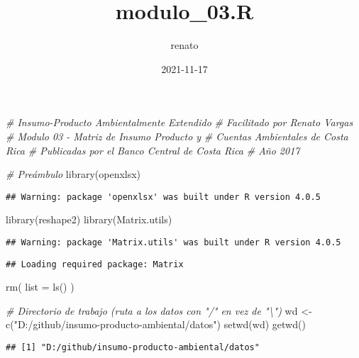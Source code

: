 \documentclass[
]{article}
\title{modulo\_03.R}
\author{renato}
\date{2021-11-17}
\newenvironment{Shaded}{\begin{snugshade}}{\end{snugshade}}
\newcommand{\AttributeTok}[1]{\textcolor[rgb]{0.77,0.63,0.00}{#1}}
\newcommand{\CommentTok}[1]{\textcolor[rgb]{0.56,0.35,0.01}{\textit{#1}}}
\newcommand{\FunctionTok}[1]{\textcolor[rgb]{0.00,0.00,0.00}{#1}}
\newcommand{\NormalTok}[1]{#1}
\newcommand{\OtherTok}[1]{\textcolor[rgb]{0.56,0.35,0.01}{#1}}
\newcommand{\StringTok}[1]{\textcolor[rgb]{0.31,0.60,0.02}{#1}}
\begin{document}
\maketitle

\begin{Shaded}
\begin{Highlighting}[]
\CommentTok{\# Insumo{-}Producto Ambientalmente Extendido}
\CommentTok{\# Facilitado por Renato Vargas}
\CommentTok{\# Modulo 03 {-} Matriz de Insumo Producto y }
\CommentTok{\# Cuentas Ambientales de Costa Rica}
\CommentTok{\# Publicadas por el Banco Central de Costa Rica}
\CommentTok{\# Año 2017}

\CommentTok{\# Preámbulo}
\FunctionTok{library}\NormalTok{(openxlsx)}
\end{Highlighting}
\end{Shaded}

\begin{verbatim}
## Warning: package 'openxlsx' was built under R version 4.0.5
\end{verbatim}

\begin{Shaded}
\begin{Highlighting}[]
\FunctionTok{library}\NormalTok{(reshape2)}
\FunctionTok{library}\NormalTok{(Matrix.utils)}
\end{Highlighting}
\end{Shaded}

\begin{verbatim}
## Warning: package 'Matrix.utils' was built under R version 4.0.5
\end{verbatim}

\begin{verbatim}
## Loading required package: Matrix
\end{verbatim}

\begin{Shaded}
\begin{Highlighting}[]
\FunctionTok{rm}\NormalTok{(  }\AttributeTok{list =} \FunctionTok{ls}\NormalTok{()  )}


\CommentTok{\# Directorio de trabajo (ruta a los datos con "/" en vez de "\textbackslash{}")}
\NormalTok{wd }\OtherTok{\textless{}{-}} \FunctionTok{c}\NormalTok{(}\StringTok{"D:/github/insumo{-}producto{-}ambiental/datos"}\NormalTok{)}
\FunctionTok{setwd}\NormalTok{(wd)}
\FunctionTok{getwd}\NormalTok{()}
\end{Highlighting}
\end{Shaded}

\begin{verbatim}
## [1] "D:/github/insumo-producto-ambiental/datos"
\end{verbatim}
\end{document}
